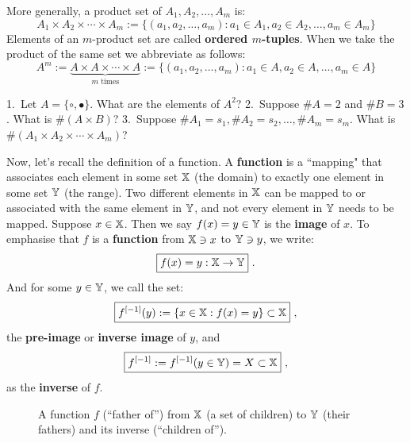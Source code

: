 More generally, a product set of $A_1,A_2,\ldots,A_m$ is:
\[
\boxed{
A_1 \times A_2 \times \cdots \times A_m := \{(a_1,a_2,\ldots,a_{m}): a_1 \in A_1, a_2 \in A_2, \ldots, a_{m} \in A_m \}
}
\]
Elements of an $m$-product set are called {\bf ordered $m$-tuples}.  When we take the product of the same set we abbreviate as follows:
\[
\boxed{
A^m := \underset{m \text{ times}}{\underbrace{A \times A \times \cdots \times A}} := \{(a_1,a_2,\ldots,a_m): a_1 \in A, a_2 \in A, \ldots, a_{m} \in A \}
}
\]
\begin{classwork}
1.~Let $A=\{\circ, \bullet \}$.  What are the elements of $A^2$?  2.~Suppose $\# A = 2$ and $\# B = 3$.  What is $\# (A \times B)$?  3.~Suppose $\# A_1 = s_1, \# A_2 = s_2, \ldots, \# A_m = s_m$.  What is $\# (A_1 \times A_2 \times \cdots \times A_m)$?
\vspace{4cm}
\end{classwork}

Now, let's recall the definition of a function.  A {\bf function} is a ``mapping" that associates each element in some set $\mathbb{X}$ (the domain) to exactly one element in some set $\mathbb{Y}$ (the range). Two different elements in $\mathbb{X}$ can be mapped to or associated with the same element in $\mathbb{Y}$, and not every element in $\mathbb{Y}$ needs to be mapped.  Suppose $x \in \mathbb{X}$. Then we say ${f(x)=y \in \mathbb{Y}}$ is the {\bf image} of $x$.  To emphasise that $f$ is a {\bf function} from $\mathbb{X} \ni x$ to $\mathbb{Y} \ni y$, we write:
$$\boxed{f(x)=y:\mathbb{X} \to \mathbb{Y}} \ .$$
And for some $y \in \mathbb{Y}$, we call the set:
$$\boxed{f^{[-1]}(y) := \{x \in \mathbb{X} : f(x)=y \} \subset \mathbb{X}} \ ,$$
the {\bf pre-image} or {\bf inverse image} of $y$, and 
$$\boxed{f^{[-1]} := f^{[-1]}(y \in \mathbb{Y}) = X \subset \mathbb{X}} \ ,$$
as the {\bf inverse} of $f$.

\begin{figure}[htpb]
\caption{A function $f$ (``father of'') from $\mathbb{X}$ (a set of children) to $\mathbb{Y}$ (their fathers) and its inverse (``children of'').\label{F:function}}
\vspace{4cm}
\end{figure}

